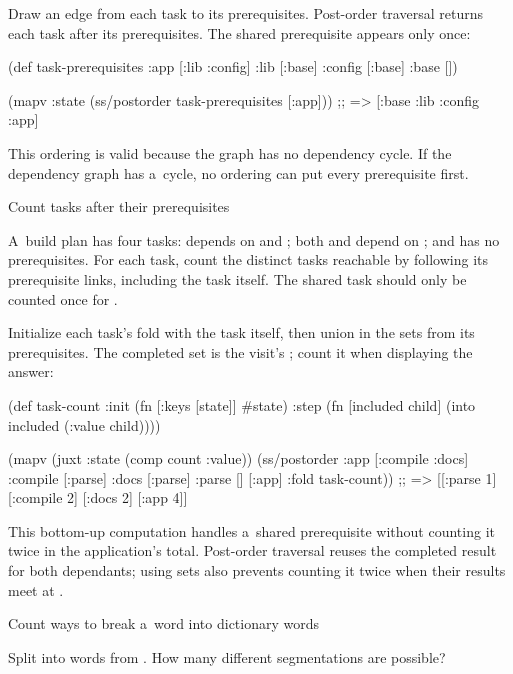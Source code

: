 {{{\smallskip
{} Draw an edge from each task to its prerequisites.
Post-order traversal returns each task after its prerequisites. The shared
 prerequisite appears only once:

\begtt {}
(def task-prerequisites
  {:app [:lib :config]
   :lib [:base]
   :config [:base]
   :base []})

(mapv :state
      (ss/postorder task-prerequisites [:app]))
;; => [:base :lib :config :app]
\endtt

This ordering is valid because the graph has no dependency cycle. If the
dependency graph has a~cycle, no ordering can put every prerequisite first.

\secc Count tasks after their prerequisites

 A~build plan has four tasks:  depends on
 and ; both  and 
depend on ; and  has no prerequisites. For each
task, count the distinct tasks reachable by following its prerequisite
links, including the task itself. The shared  task should only
be counted once for .

\smallskip
{} Initialize each task's fold with the task itself,
then union in the sets from its prerequisites. The completed set is the
visit's ; count it when displaying the answer:

\begtt {}
(def task-count
  {:init (fn [{:keys [state]}] #{state})
   :step (fn [included child] (into included (:value child)))})

(mapv (juxt :state (comp count :value))
      (ss/postorder {:app [:compile :docs]
                           :compile [:parse]
                           :docs [:parse]
                           :parse []}
                          [:app]
                          {:fold task-count}))
;; => [[:parse 1] [:compile 2] [:docs 2] [:app 4]]
\endtt

This bottom-up computation handles a~shared prerequisite without counting
it twice in the application's total. Post-order traversal reuses the
completed  result for both dependants; using sets also prevents
counting it twice when their results meet at .

\secc Count ways to break a~word into dictionary words

 Split  into words from
. How many different
segmentations are possible?

}}}
